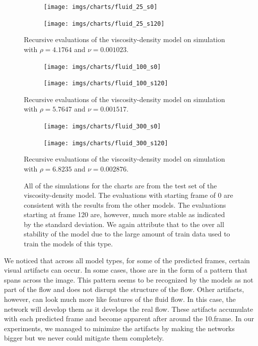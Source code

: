 \documentclass{llncs}
\begin{document}
\begin{figure}
  \begin{subfigure}{.5\textwidth}
    \centering
    \texttt{[image: imgs/charts/fluid\_25\_s0]}
  \end{subfigure}
  \begin{subfigure}{.5\textwidth}
    \centering
    \texttt{[image: imgs/charts/fluid\_25\_s120]}
  \end{subfigure}
  \begin{center}
    Recursive evaluations of the viscosity-density model on simulation with $\rho=4.1764$ and $\nu=0.001023$.
  \end{center}
  \begin{subfigure}{.5\textwidth}
    \centering
    \texttt{[image: imgs/charts/fluid\_100\_s0]}
  \end{subfigure}
  \begin{subfigure}{.5\textwidth}
    \centering
    \texttt{[image: imgs/charts/fluid\_100\_s120]}
  \end{subfigure}
  \begin{center}
    Recursive evaluations of the viscosity-density model on simulation with $\rho=5.7647$ and $\nu=0.001517$.
  \end{center}
  \begin{subfigure}{.5\textwidth}
    \centering
    \texttt{[image: imgs/charts/fluid\_300\_s0]}
  \end{subfigure}
  \begin{subfigure}{.5\textwidth}
    \centering
    \texttt{[image: imgs/charts/fluid\_300\_s120]}
  \end{subfigure}
  \begin{center}
    Recursive evaluations of the viscosity-density model on simulation with $\rho=6.8235$ and $\nu=0.002876$.
  \end{center}  
  \caption{All of the simulations for the charts are from the test set of the viscosity-density model. The evaluations with starting frame of 0 are consistent with the results from the other models. The evaluations starting at frame 120 are, however, much more stable as indicated by the standard deviation. We again attribute that to the over all stability of the model due to the large amount of train data used to train the models of this type.}\label{fig:rec_fluid_psnr}
\end{figure}

We noticed that across all model types, for some of the predicted frames, certain visual artifacts can occur. In some cases, those are in the form of a pattern that spans across the image. This pattern seems to be recognized by the models as not part of the flow and does not disrupt the structure of the flow. Other artifacts, however, can look much more like features of the fluid flow. In this case, the network will develop them as it develops the real flow. These artifacts accumulate with each predicted frame and become apparent after around the 10.\@ frame. In our experiments, we managed to minimize the artifacts by making the networks bigger but we never could mitigate them completely.
\end{document}
